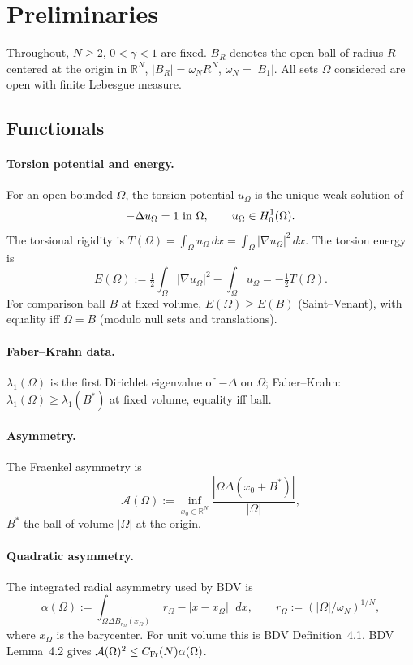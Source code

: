 \documentclass[11pt]{amsart}
\theoremstyle{definition}
\newcommand{\R}{\mathbb R}
\newcommand{\abs}[1]{\left|#1\right|}
\renewcommand{\d}{\,d}
\begin{document}
\section{Preliminaries}\label{sec:prelim}

Throughout, $N\ge2$, $0<\gamma<1$ are fixed. $B_R$ denotes the open ball
of radius $R$ centered at the origin in $\R^N$, $\abs{B_R}=\omega_NR^N$,
$\omega_N=\abs{B_1}$. All sets $\Omega$ considered are open with finite
Lebesgue measure.

\subsection{Functionals}

\paragraph{Torsion potential and energy.}
For an open bounded $\Omega$, the torsion potential $u_\Omega$ is the unique
weak solution of
\[
-\Delta u_\Omega=1\hbox{ in }\Omega,\qquad u_\Omega\in H^1_0(\Omega).
\]
The torsional rigidity is $T(\Omega)=\int_\Omega u_\Omega\d x
=\int_\Omega\abs{\nabla u_\Omega}^2\d x$. The torsion energy is
\[
E(\Omega):=\tfrac12\int_\Omega\abs{\nabla u_\Omega}^2-\int_\Omega u_\Omega
=-\tfrac12 T(\Omega).
\]
For comparison ball $B$ at fixed volume,
$E(\Omega)\ge E(B)$ (Saint--Venant), with equality iff $\Omega=B$
(modulo null sets and translations).

\paragraph{Faber--Krahn data.}
$\lambda_1(\Omega)$ is the first Dirichlet eigenvalue of $-\Delta$ on
$\Omega$; Faber--Krahn: $\lambda_1(\Omega)\ge\lambda_1(B^*)$ at fixed
volume, equality iff ball.

\paragraph{Asymmetry.}
The Fraenkel asymmetry is
\[
\mathcal A(\Omega):=
\inf_{x_0\in\R^N}\frac{\abs{\Omega\Delta(x_0+B^*)}}{\abs{\Omega}},
\]
$B^*$ the ball of volume $\abs{\Omega}$ at the origin.

\paragraph{Quadratic asymmetry.}
The integrated radial asymmetry used by BDV is
\[
\alpha(\Omega):=
\int_{\Omega\Delta B_{r_\Omega}(x_\Omega)}
\bigl|r_\Omega-\abs{x-x_\Omega}\bigr|\,\d x,
\qquad
r_\Omega:=(\abs{\Omega}/\omega_N)^{1/N},
\]
where $x_\Omega$ is the barycenter. For unit volume this is BDV Definition~4.1.
BDV Lemma~4.2 gives $\mathcal A(\Omega)^2\le C_{\rm Fr}(N)\alpha(\Omega)$.
\end{document}
